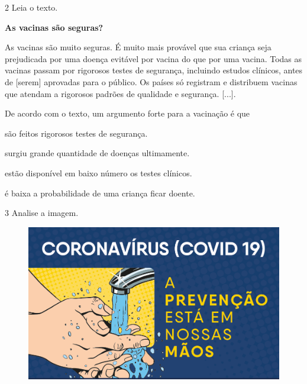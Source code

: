 \num{2} Leia o texto.

\begin{myquote}
\textbf{As vacinas são seguras?}

As vacinas são muito seguras. É muito mais provável que sua criança seja
prejudicada por uma doença evitável por vacina do que por uma vacina.
Todas as vacinas passam por rigorosos testes de segurança, incluindo
estudos clínicos, antes de {[}serem{]} aprovadas para o público. Os países só
registram e distribuem vacinas que atendam a rigorosos padrões de
qualidade e segurança.
{[}...{]}.
\end{myquote}

\pagebreak

\noindent{}De acordo com o texto, um argumento forte para a vacinação é que

\begin{escolha}
\item são feitos rigorosos testes de segurança.

\item surgiu grande quantidade de doenças ultimamente.

\item estão disponível em baixo número os testes clínicos.

\item é baixa a probabilidade de uma criança ficar doente.
\end{escolha}



\num{3} Analise a imagem.

\begin{figure}[htpb!]
\includegraphics[width=\textwidth]{./imgs/img15.png}
\end{figure}

